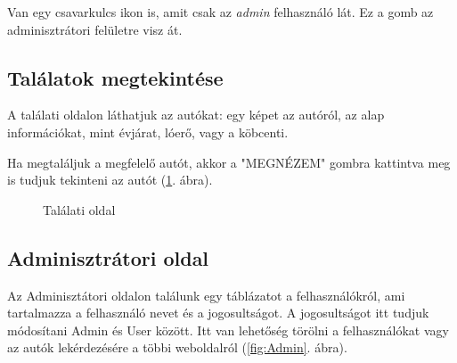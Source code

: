 Van egy csavarkulcs ikon is, amit csak az \textit{admin} felhasználó lát. Ez a gomb az adminisztrátori felületre visz át.

\subsection{Találatok megtekintése}

A találati oldalon láthatjuk az autókat: egy képet az autóról, az alap információkat, mint évjárat, lóerő, vagy a köbcenti.

Ha megtaláljuk a megfelelő autót, akkor a "MEGNÉZEM" gombra kattintva meg is tudjuk tekinteni az autót (\ref{fig:Talalatok}. ábra).
\newpage

\begin{figure}[h]
\centering
{}
\caption{Találati oldal}
\label{fig:Talalatok}
\end{figure}

\subsection{Adminisztrátori oldal}

Az Adminisztátori oldalon találunk egy táblázatot a felhasználókról, ami tartalmazza a felhasználó nevet és a jogosultságot. A jogosultságot itt tudjuk módosítani Admin és User között. Itt van lehetőség törölni a felhasználókat vagy az autók lekérdezésére a többi weboldalról (\ref{fig:Admin}. ábra).


